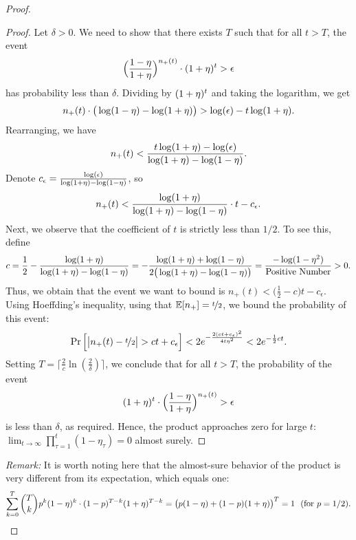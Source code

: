 \begin{proof}
    \begin{proof}
        Let $\delta > 0$. We need to show that there exists $T$ such that for all $t > T$, the event
        \[
        \Big(\frac{1 - \eta}{1 + \eta}\Big)^{n_+(t)} \cdot (1 + \eta)^t > \epsilon
        \]
        has probability less than $\delta$. 
        Dividing by $(1 + \eta)^t$ and taking the logarithm, we get 
        \[
        n_+(t) \cdot \big(\log(1 - \eta) - \log(1 + \eta)\big) > \log(\epsilon) - t \log(1 + \eta).
        \]
        Rearranging, we have
        \[
        n_+(t) < \frac{t \log(1 + \eta) - \log(\epsilon)}{\log(1 + \eta) - \log(1 - \eta)}.
        \]
        Denote $c_{\epsilon} = \frac{\log(\epsilon)}{\log(1 + \eta) - \log(1 - \eta)}$,
        so
        \[
        n_+(t) < \frac{\log(1 + \eta)}{\log(1 + \eta) - \log(1 - \eta)} \cdot t - c_{\epsilon}.
        \]
        Next, we observe that the coefficient of $t$ is strictly less than $1/2$. To see this, define
        \[
        c = \frac{1}{2} - \frac{\log(1 + \eta)}{\log(1 + \eta) - \log(1 - \eta)} = -\frac{\log(1 + \eta) + \log(1 - \eta)}{2 \big(\log(1 + \eta) - \log(1 - \eta)\big)} = \frac{-\log(1 - \eta^2)}{\text{Positive Number}} > 0.
        \]
        Thus, we obtain that the event we want to bound is
        $
        n_+(t) < \Big(\frac{1}{2} - c\Big)t - c_{\epsilon}.
        $
        Using Hoeffding's inequality, using that $\operatorname{\mathbb{E}}[n_+] = \nicefrac{t}{2}$, we bound the probability of this event:
        \[
        \Pr\Big[\big|n_+(t) - \nicefrac{t}{2}\big| > ct + c_{\epsilon}\Big] < 2e^{-\frac{2(ct + c_{\epsilon})^2}{4t \eta^2}} < 2e^{-\frac{1}{2}ct}.
        \]
        Setting $T = \lceil \frac{2}{c} \ln\left(\frac{2}{\delta}\right)
        \rceil$, we conclude that for all $t > T$, the probability of the event
        \[
        (1 + \eta)^t \cdot \Big(\frac{1 - \eta}{1 + \eta}\Big)^{n_+(t)} > \epsilon
        \]
        is less than $\delta$, as required. Hence, the product approaches zero for large $t$:
        $
        \lim_{t \rightarrow \infty} \prod_{\tau=1}^t (1 - \eta_\tau) = 0
        $ almost surely.
    \end{proof}
    \noindent
    {\em Remark:} It is worth noting here that the almost-sure behavior of the product is very different from its expectation, which equals one: 
    $$\sum_{k=0}^T \binom{T}{k} p^k(1 - \eta)^k \cdot (1 - p)^{T - k} (1 + \eta)^{T - k} = \big(p (1 - \eta) + (1 - p) (1 + \eta)\big)^T = 1 \ \text{ (for $p = 1/2$)}.$$


\end{proof}
